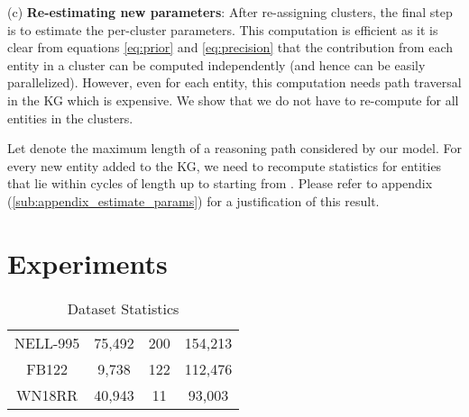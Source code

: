 \documentclass[11pt,a4paper]{article}
\begin{document}
(c) \textbf{Re-estimating new parameters}: After re-assigning clusters, the final step is to estimate the per-cluster parameters. This computation is efficient as it is clear from equations \ref{eq:prior} and \ref{eq:precision} that the contribution from each entity in a cluster can be computed independently (and hence can be easily parallelized). However, even for each entity, this computation needs path traversal in the KG which is expensive. We show that we do not have to re-compute for all entities in the clusters.

Let  denote the maximum length of a reasoning path considered by our model. For every new entity  added to the KG, we need to recompute statistics for entities that lie within cycles of length up to  starting from . 
Please refer to appendix (\ref{sub:appendix_estimate_params}) for a justification of this result. \section{Experiments}
\label{sec:experiments}
\begin{table}[]
    \centering
    \begin{tabular}{cccc}
    \toprule
        &   &  &  \\
        \midrule
         NELL-995 & 75,492 & 200 & 154,213  \\
         FB122 & 9,738 & 122 & 112,476 \\
         WN18RR & 40,943 & 11 & 93,003 \\
         \bottomrule
    \end{tabular}
    \caption{Dataset Statistics}
    \label{tab:dataset_stats}
\end{table}
\end{document}
